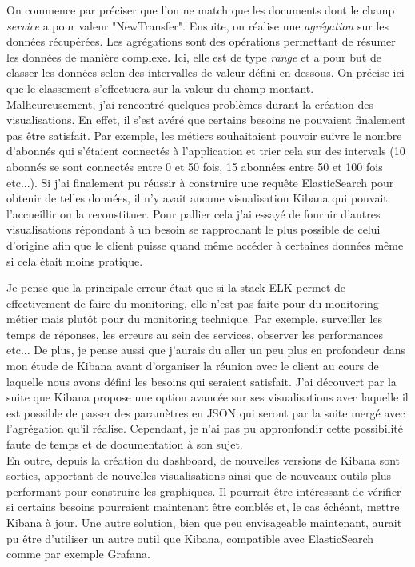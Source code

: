 	On commence par préciser que l'on ne match que les documents dont le champ \textit{service} a pour valeur "NewTransfer". Ensuite, on réalise une \textit{agrégation} sur les données récupérées. Les agrégations sont des opérations permettant de résumer les données de manière complexe. Ici, elle est de type \textit{range} et a pour but de classer les données selon des intervalles de valeur défini en dessous. On précise ici que le classement s'effectuera sur la valeur du champ montant. \\
	
	Malheureusement, j'ai rencontré quelques problèmes durant la création des visualisations. En effet, il s'est avéré que certains besoins ne pouvaient finalement pas être satisfait. Par exemple, les métiers souhaitaient pouvoir suivre le nombre d'abonnés qui s'étaient connectés à l'application et trier cela sur des intervals (10 abonnés se sont connectés entre 0 et 50 fois, 15 abonnées entre 50 et 100 fois etc...). Si j'ai finalement pu réussir à construire une requête ElasticSearch pour obtenir de telles données, il n'y avait aucune visualisation Kibana qui pouvait l'accueillir ou la reconstituer. Pour pallier cela j'ai essayé de fournir d'autres visualisations répondant à un besoin se rapprochant le plus possible de celui d'origine afin que le client puisse quand même accéder à certaines données même si cela était moins pratique.
	
	Je pense que la principale erreur était que si la stack ELK permet de effectivement de faire du monitoring, elle n'est pas faite pour du monitoring métier mais plutôt pour du monitoring technique. Par exemple, surveiller les temps de réponses, les erreurs au sein des services, observer les performances etc... De plus, je pense aussi que j'aurais du aller un peu plus en profondeur dans mon étude de Kibana avant d'organiser la réunion avec le client au cours de laquelle nous avons défini les besoins qui seraient satisfait. J'ai découvert par la suite que Kibana propose une option avancée sur ses visualisations avec laquelle il est possible de passer des paramètres en JSON qui seront par la suite mergé avec l'agrégation qu'il réalise. Cependant, je n'ai pas pu appronfondir cette possibilité faute de temps et de documentation à son sujet. \\
	
	En outre, depuis la création du dashboard, de nouvelles versions de Kibana sont sorties, apportant de nouvelles visualisations ainsi que de nouveaux outils plus performant pour construire les graphiques. Il pourrait être intéressant de vérifier si certains besoins pourraient maintenant être comblés et, le cas échéant, mettre Kibana à jour. Une autre solution, bien que peu envisageable maintenant, aurait pu être d'utiliser un autre outil que Kibana, compatible avec ElasticSearch comme par exemple Grafana.